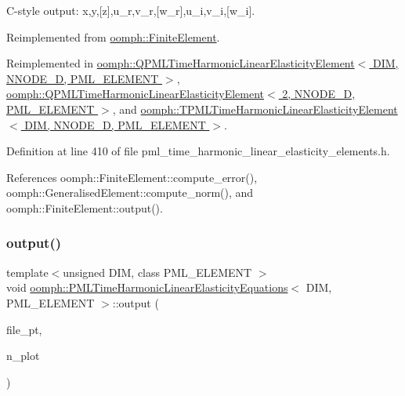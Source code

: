 C-\/style output\+: x,y,\mbox{[}z\mbox{]},u\+\_\+r,v\+\_\+r,\mbox{[}w\+\_\+r\mbox{]},u\+\_\+i,v\+\_\+i,\mbox{[}w\+\_\+i\mbox{]}. 



Reimplemented from \hyperlink{classoomph_1_1FiniteElement_a72cddd09f8ddbee1a20a1ff404c6943e}{oomph\+::\+Finite\+Element}.



Reimplemented in \hyperlink{classoomph_1_1QPMLTimeHarmonicLinearElasticityElement_a9eb0c961540da01cd8a8ff04eefa5c9f}{oomph\+::\+Q\+P\+M\+L\+Time\+Harmonic\+Linear\+Elasticity\+Element$<$ D\+I\+M, N\+N\+O\+D\+E\+\_\+D, P\+M\+L\+\_\+\+E\+L\+E\+M\+E\+N\+T $>$}, \hyperlink{classoomph_1_1QPMLTimeHarmonicLinearElasticityElement_a9eb0c961540da01cd8a8ff04eefa5c9f}{oomph\+::\+Q\+P\+M\+L\+Time\+Harmonic\+Linear\+Elasticity\+Element$<$ 2, N\+N\+O\+D\+E\+\_\+D, P\+M\+L\+\_\+\+E\+L\+E\+M\+E\+N\+T $>$}, and \hyperlink{classoomph_1_1TPMLTimeHarmonicLinearElasticityElement_ad6b5c28537ce21dd900d030da1df54ec}{oomph\+::\+T\+P\+M\+L\+Time\+Harmonic\+Linear\+Elasticity\+Element$<$ D\+I\+M, N\+N\+O\+D\+E\+\_\+D, P\+M\+L\+\_\+\+E\+L\+E\+M\+E\+N\+T $>$}.



Definition at line 410 of file pml\+\_\+time\+\_\+harmonic\+\_\+linear\+\_\+elasticity\+\_\+elements.\+h.



References oomph\+::\+Finite\+Element\+::compute\+\_\+error(), oomph\+::\+Generalised\+Element\+::compute\+\_\+norm(), and oomph\+::\+Finite\+Element\+::output().

\mbox{\label{classoomph_1_1PMLTimeHarmonicLinearElasticityEquations_a27d100b419a9dfde06275bd3c3c73681}} 
\subsubsection{\texorpdfstring{output()}{output()}\hspace{0.1cm}{\footnotesize\ttfamily [4/4]}}
{\footnotesize\ttfamily template$<$unsigned D\+IM, class P\+M\+L\+\_\+\+E\+L\+E\+M\+E\+NT $>$ \\
void \hyperlink{classoomph_1_1PMLTimeHarmonicLinearElasticityEquations}{oomph\+::\+P\+M\+L\+Time\+Harmonic\+Linear\+Elasticity\+Equations}$<$ D\+IM, P\+M\+L\+\_\+\+E\+L\+E\+M\+E\+NT $>$\+::output (\begin{DoxyParamCaption}\item[{F\+I\+LE $\ast$}]{file\+\_\+pt,  }\item[{const unsigned \&}]{n\+\_\+plot }\end{DoxyParamCaption})\hspace{0.3cm}{\ttfamily [virtual]}}



